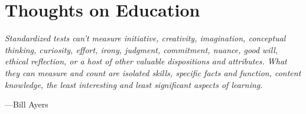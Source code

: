 \chapter{Thoughts on Education}

\vspace{4mm}
\begin{displayquote}
    \textit{Standardized tests can't measure initiative, creativity, imagination, conceptual thinking, curiosity, effort, irony, judgment, commitment, nuance, good will, ethical reflection, or a host of other valuable dispositions and attributes. What they can measure and count are isolated skills, specific facts and function, content knowledge, the least interesting and least significant aspects of learning.}
    \vspace{2mm}
    \begin{flushright}
	---Bill Ayers
    \end{flushright}
\end{displayquote}
\vspace{4mm}

